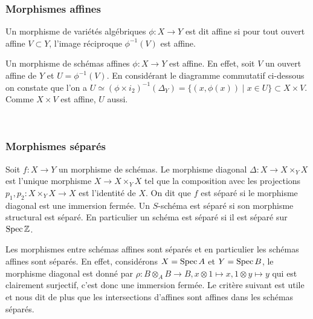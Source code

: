 \subsubsection{Morphismes affines}

\begin{defn}
Un morphisme de variétés algébriques $\phi: X\rightarrow Y$ est dit affine si pour tout ouvert affine $V\subset Y$, l'image réciproque $\phi^{-1}(V)$ est affine.
\end{defn}

\begin{ex}\label{exaff}
Un morphisme de schémas affines $\phi: X\rightarrow Y$ est affine. En effet, soit $V$ un ouvert affine de $Y$ et $U=\phi^{-1}(V)$. En considérant le diagramme commutatif ci-dessous on constate que l'on a $U \simeq (\phi\times i_2)^{-1}(\Delta_Y)=\lbrace (x,\phi(x))\mid x\in U \rbrace \subset X\times V$. Comme $X\times V$ est affine, $U$ aussi.
	\begin{center}
	\\
	\end{center}

\end{ex}

\subsubsection{Morphismes séparés}

\begin{defn}
Soit $f:X\rightarrow Y$ un morphisme de schémas. Le morphisme diagonal $\Delta:X\rightarrow X\times_Y X$ est l'unique morphisme $X\rightarrow X\times_Y X$ tel que la composition avec les projections $p_1,p_2:X\times_Y X\rightarrow X$ est l'identité de $X$. On dit que $f$ est séparé si le morphisme diagonal est une immersion fermée.
Un $S$-schéma est séparé si son morphisme structural est séparé. En particulier un schéma est séparé si il est séparé sur $\operatorname{Spec}\mathbb{Z}$.
\end{defn}

Les morphismes entre schémas affines sont séparés et en particulier les schémas affines sont séparés. En effet, considérons $X=\operatorname{Spec} A$ et $Y=\operatorname{Spec} B$, le morphisme diagonal est donné par $\rho: B\otimes_A B\rightarrow B, x\otimes 1\mapsto x, 1\otimes y \mapsto y$ qui est clairement surjectif, c'est donc une immersion fermée. Le critère suivant est utile et nous dit de plus que les intersections d'affines sont affines dans les schémas séparés.

